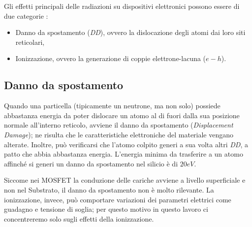 
Gli effetti principali delle radiazioni su dispositivi elettronici possono essere di due categorie \cite{bib:Effetti_Radiazioni_1987}:
\begin{itemize}
	\item Danno da spostamento {(\textit{DD})}, ovvero la dislocazione degli atomi dai loro siti reticolari,
	\item Ionizzazione, ovvero la generazione di coppie elettrone-lacuna ($e-h$).
\end{itemize}

\subsection{Danno da spostamento}
Quando una particella (tipicamente un neutrone, ma non solo) possiede abbastanza energia da poter dislocare un atomo al di fuori dalla sua posizione normale all'interno reticolo, avviene il danno da spostamento (\textit{Displacement Damage}); ne risulta che le caratteristiche elettroniche del materiale vengano alterate.
Inoltre, può verificarsi che l'atomo colpito generi a sua volta altri \textit{DD}, a patto che abbia abbastanza energia. L'energia minima da trasferire a un atomo affinché si generi un danno da spostamento nel silicio è di $20 eV$.


\vspace*{0.5cm}

Siccome nei MOSFET la conduzione delle cariche avviene a livello superficiale e non nel Substrato, il danno da spostamento non è molto rilevante. La ionizzazione, invece, può comportare variazioni dei parametri elettrici come guadagno e tensione di soglia; per questo motivo in questo lavoro ci concentreremo solo sugli effetti della ionizzazione.

 

